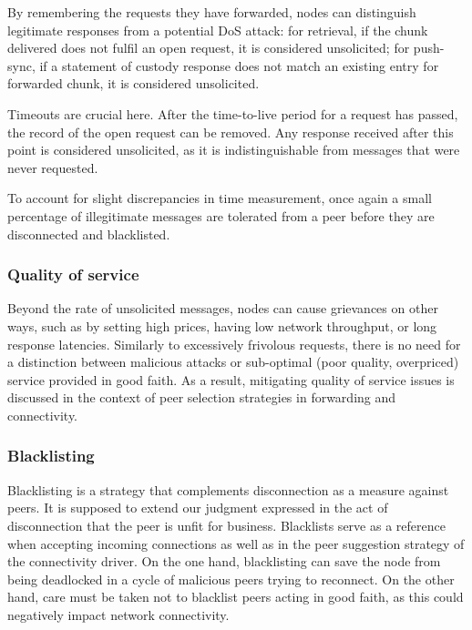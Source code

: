 By remembering the requests they have forwarded, nodes can distinguish legitimate responses from a potential DoS attack: for retrieval, if the chunk delivered does not fulfil an open request, it is considered unsolicited; for push-sync, if a statement of custody response does not match an existing entry for forwarded chunk, it is considered unsolicited.

Timeouts are crucial here. After the time-to-live period for a request has passed, the record of the open request can be removed. Any response received after this point is considered unsolicited, as it is indistinguishable from messages that were never requested. 

To account for slight discrepancies in time measurement, once again a small percentage of illegitimate messages are tolerated from a peer before they are disconnected and blacklisted.

\subsubsection{Quality of service}

Beyond the rate of unsolicited messages, nodes can cause grievances on other ways, such as by setting high prices, having low network throughput, or long response latencies. Similarly to excessively frivolous requests, there is no need for a distinction between malicious attacks or sub-optimal (poor quality, overpriced) service provided in good faith. As a result, mitigating quality of service issues is discussed in the context of peer selection strategies in forwarding and connectivity.

\subsubsection{Blacklisting}

Blacklisting is a strategy that complements disconnection as a measure against peers. It is supposed to extend our judgment expressed in the act of disconnection that the peer is unfit for business.
Blacklists serve as a reference when accepting incoming connections as well as in the peer suggestion strategy of the connectivity driver. On the one hand, blacklisting can save the node from being deadlocked in a cycle of malicious peers trying to reconnect. On the other hand, care must be taken not to blacklist peers acting in good faith, as this could negatively impact network connectivity.





